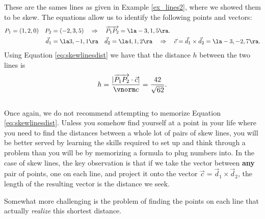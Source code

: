 {These are the sames lines as given in Example \ref{ex_lines2}, where we showed them to be skew. The equations allow us to identify the following points and vectors:
\begin{align*}
P_1 = (1,2,0)\quad P_2 &= (-2,3,5) \quad \Rightarrow \quad \overrightarrow{P_1P_2} = \la -3,1,5\ra.\\
\vec d_1 &= \la 3,-1,1\ra \quad \vec d_2 = \la 4,1,2\ra \quad \Rightarrow \quad \vec c = \vec d_1\times \vec d_2 = \la -3,-2,7\ra.
\end{align*}
Using Equation \eqref{eq:skewlinesdist} we have that the distance $h$ between the two lines is
\[
h = \frac{|\overrightarrow{P_1P_2}\cdot \vec c|}{\vnorm c}=\frac{42}{\sqrt{62}}.
\]
}\\

Once again, we do not recommend attempting to memorize Equation \eqref{eq:skewlinesdist}. Unless you somehow find yourself at a point in your life where you need to find the distances between a whole lot of pairs of skew lines, you will be better served by learning the skills required to set up and think through a problem than you will be by memorizing a formula to plug numbers into. In the case of skew lines, the key observation is that if we take the vector between \textbf{any} pair of points, one on each line, and project it onto the vector $\vec c = \vec{d}_1\times\vec{d}_2$, the length of the resulting vector is the distance we seek.

Somewhat more challenging is the problem of finding the points on each line that actually \textit{realize} this shortest distance.\\

